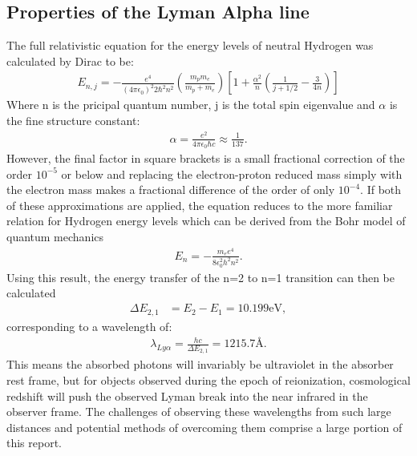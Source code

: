 	\subsection{Properties of the Lyman Alpha line} %
	\label{sub:properties_of_the_lyman_alpha_line}
		The full relativistic equation for the energy levels of neutral Hydrogen was calculated by Dirac to be\cite{EisbergResnick}:
		\begin{align}
			E_{n,j} = - \frac{e^4}{ (4 \pi \epsilon_0)^2 2 \hbar^2 n^2} \left( \frac{m_p m_e}{m_p + m_e} \right) %
				\left [ 1 + \frac{\alpha^2}{n} \left( \frac{1}{j+1/2} - \frac{3}{4n} \right) \right]
		\end{align}
		Where n is the pricipal quantum number, j is the total spin eigenvalue and $\alpha$ is the fine structure constant:
		\begin{align}
			\alpha = \frac{e^2}{4 \pi \epsilon_0 \hbar c}  \approx \frac{1}{137}.
		\end{align}
		However, the final factor in square brackets is a small fractional correction of the order $10^{-5}$ or below and replacing the electron-proton reduced mass simply with the electron mass makes a fractional difference of the order of only $10^{-4}$. If both of these approximations are applied, the equation reduces to the more familiar relation for Hydrogen energy levels which can be derived from the Bohr model of quantum mechanics
		\begin{align}
			E_n = - \frac{m_e e^4}{8 \epsilon_0^2 h^2 n^2}.
		\end{align}
		Using this result, the energy transfer of the n=2 to n=1 transition can then be calculated
		\begin{align}
			\Delta E_{2,1} &= E_2 - E_1 = 10.199\si{\electronvolt} ,
		\end{align}
		corresponding to a wavelength of:
		\begin{align}
			\lambda_{Ly\alpha} = \frac{hc}{\Delta E_{2,1}} = 1215.7 \si{\angstrom}.
		\end{align}
		This means the absorbed photons will invariably be ultraviolet in the absorber rest frame, but for objects observed during the epoch of reionization, cosmological redshift will push the observed Lyman break into the near infrared in the observer frame. The challenges of observing these wavelengths from such large distances and potential methods of overcoming them comprise a large portion of this report.



